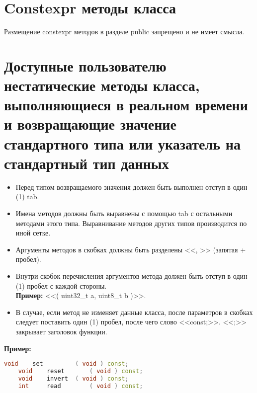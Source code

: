 \section{Constexpr методы класса}\label{constexpr:0}
Размещение constexpr методов в разделе public запрещено и не имеет смысла.

\section{Доступные пользователю нестатические методы класса, выполняющиеся в реальном времени и возвращающие значение стандартного типа или указатель на стандартный тип данных}\label{dp:n:s}
\begin{itemize}
	\item Перед типом возвращаемого значения должен быть выполнен отступ в один (1) tab.
	\item Имена методов должны быть выравнены с помощью tab с остальными методами этого типа. Выравнивание методов других типов производится по иной сетке.
	\item Аргументы методов в скобках должны быть разделены <<, >> (запятая + пробел).
	\item Внутри скобок перечисления аргументов метода должен быть отступ в один (1) пробел с каждой стороны.\\\textbf{Пример: } <<( uint32\_t a, uint8\_t b )>>.
	\item В случае, если метод не изменяет данные класса, после параметров в скобках следует поставить один (1) пробел, после чего слово <<const;>>. <<;>> закрывает заголовок функции.
\end{itemize}
\textbf{Пример:}\begin{lstlisting}[language=C++, frame=tlBR, basicstyle=\fontsize{10}{10}\ttfamily]
	void	set			( void ) const;
	void	reset		( void ) const;
	void	invert	( void ) const;
	int		read		( void ) const;
\end{lstlisting}

